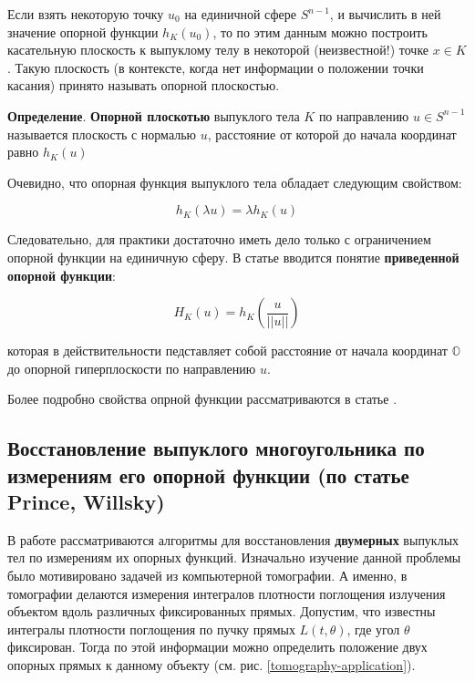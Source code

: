 \documentclass[a4paper,12pt, titlepage]{article}
\begin{document}
Если взять некоторую точку $u_{0}$ на единичной сфере $S^{n - 1}$, и вычислить
в ней значение опорной функции $h_{K}(u_{0})$, то по этим данным можно
построить касательную плоскость к выпуклому телу в некоторой (неизвестной!)
точке $x \in K$. Такую плоскость (в контексте, когда нет информации о положении
точки касания) принято называть опорной плоскостью.

\begin{flushleft}
 \textbf{Определение}. \textbf{Опорной плоскотью} выпуклого тела $K$ по
 направлению $u \in S^{n - 1}$ называется плоскость с нормалью $u$, расстояние
 от которой до начала координат равно $h_{K}(u)$
\end{flushleft}

Очевидно, что опорная функция выпуклого тела обладает следующим свойством:

$$h_{K}(\lambda u) = \lambda h_{K}(u)$$

Следовательно, для практики достаточно иметь дело только с ограничением опорной
функции на единичную сферу. В статье \cite{journals/jmiv/KarlKVW96} вводится
понятие \textbf{приведенной опорной функции}:

$$H_{K} (u) = h_{K} (\frac{u}{||u||})$$

которая в действительности педставляет собой расстояние от начала координат
$\mathbb{O}$ до опорной гиперплоскости по направлению $u$.

Более подробно свойства опрной функции рассматриваются в статье
\cite{journals/cviu/GhoshK98}.


\subsection{Восстановление выпуклого многоугольника по измерениям его опорной
функции (по статье Prince, Willsky)}

В работе \cite[Prince - Willsky (1990)]{journals/pami/PrinceW90}
рассматриваются алгоритмы для восстановления \textbf{двумерных} выпуклых тел по
измерениям их опорных функций. Изначально изучение данной проблемы было
мотивировано задачей из компьютерной томографии. А именно, в томографии
делаются измерения интегралов плотности поглощения излучения объектом вдоль
различных фиксированных прямых. Допустим, что известны интегралы плотности
поглощения по пучку прямых $L(t, \theta)$, где угол $\theta$ фиксирован. Тогда
по этой информации можно определить положение двух опорных прямых к данному
объекту (см. рис. \ref{tomography-application}).
\end{document}
